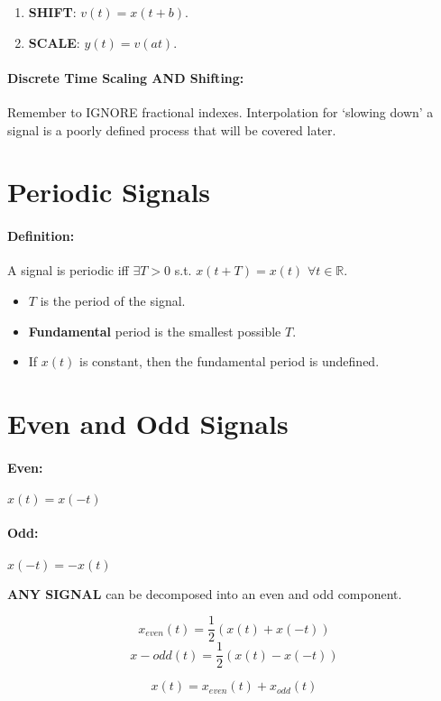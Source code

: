 \documentclass[a4paper,12pt]{report}
\def\reals{\mathbb{R}}
\begin{document}
\begin{enumerate}
\item \textbf{SHIFT}: $v(t) = x(t+b)$.
\item \textbf{SCALE}: $y(t) = v(at)$.
\end{enumerate}

\paragraph{Discrete Time Scaling AND Shifting: } Remember to IGNORE fractional indexes. Interpolation for `slowing down' a signal is a poorly defined process that will be covered later.

\section{Periodic Signals}

\paragraph{Definition: } A signal is periodic iff $\exists T > 0$ s.t. $x(t+T) = x(t)$ $\forall t\in\reals$. 

\begin{itemize}
\item $T$ is the period of the signal.
\item \textbf{Fundamental} period is the smallest possible $T$.
\item If $x(t)$ is constant, then the fundamental period is undefined.
\end{itemize}

\section{Even and Odd Signals}

\paragraph{Even: } $x(t) = x(-t)$
\paragraph{Odd: } $x(-t) = -x(t)$

\textbf{ANY SIGNAL} can be decomposed into an even and odd component.

$$x_{even}(t) = \frac{1}{2} (x(t) + x(-t))$$
$$x-{odd}(t) = \frac{1}{2} (x(t) - x(-t))$$

$$x(t) = x_{even}(t) + x_{odd}(t)$$
\end{document}
